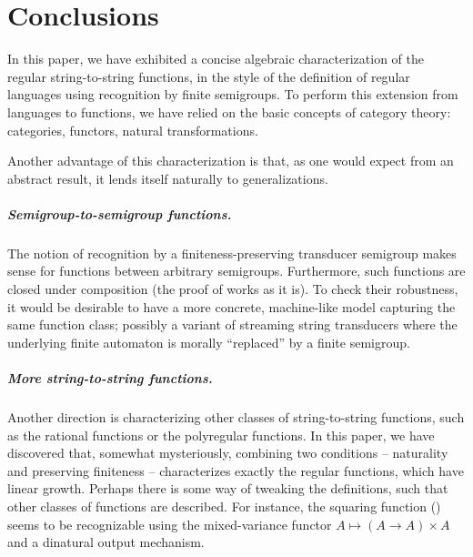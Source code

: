 \section{Conclusions}\label{sec:conclusion}

In this paper, we have exhibited a concise algebraic characterization of the
regular string-to-string functions, in the style of the definition of regular
languages using recognition by finite semigroups. To perform this extension from
languages to functions, we have relied on the basic concepts of category theory:
categories, functors, natural transformations.

Another advantage of this characterization is that, as one would expect from an
abstract result, it lends itself naturally to generalizations.

\subparagraph{Semigroup-to-semigroup functions.}

The notion of recognition by a finiteness-preserving transducer semigroup makes
sense for functions between arbitrary semigroups. Furthermore, such functions
are closed under composition (the proof of  works as it
is). To check their robustness, it would be desirable to have a more concrete,
machine-like model capturing the same function class; possibly a variant of
streaming string transducers where the underlying finite automaton is morally
\enquote{replaced} by a finite semigroup.

\subparagraph{More string-to-string functions.} Another direction is
characterizing other classes of string-to-string functions, such as the rational
functions or the polyregular functions. In this paper, we have discovered that,
somewhat mysteriously, combining two conditions -- naturality and preserving
finiteness -- characterizes exactly the regular functions, which have linear
growth. Perhaps there is some way of tweaking the definitions, such that other
classes of functions are described. For instance, the squaring function
() seems to be recognizable using the mixed-variance functor
$A \mapsto (A \to A) \times A$ and a dinatural output mechanism.

